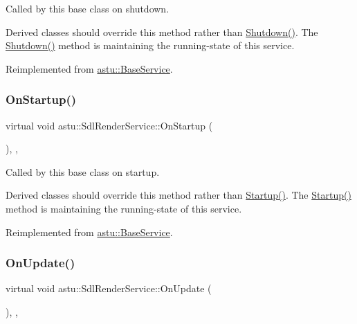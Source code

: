 Called by this base class on shutdown.

Derived classes should override this method rather than {\ttfamily \hyperlink{classastu_1_1UpdatableBaseService_a7ad7e0201007878b6014361dd5ba82f9}{Shutdown()}}. The {\ttfamily \hyperlink{classastu_1_1UpdatableBaseService_a7ad7e0201007878b6014361dd5ba82f9}{Shutdown()}} method is maintaining the running-\/state of this service. 

Reimplemented from \hyperlink{classastu_1_1BaseService_aeb5003f7c5efe5412725ac4c66942d03}{astu\+::\+Base\+Service}.

\mbox{\label{classastu_1_1SdlRenderService_a38abd541e8075e5e4eb702ca99c9b0a5}} 
\subsubsection{\texorpdfstring{On\+Startup()}{OnStartup()}}
{\footnotesize\ttfamily virtual void astu\+::\+Sdl\+Render\+Service\+::\+On\+Startup (\begin{DoxyParamCaption}{ }\end{DoxyParamCaption})\hspace{0.3cm}{\ttfamily [override]}, {\ttfamily [protected]}, {\ttfamily [virtual]}}

Called by this base class on startup.

Derived classes should override this method rather than {\ttfamily \hyperlink{classastu_1_1UpdatableBaseService_a47e3725f717cee3cd8983f485b2a0243}{Startup()}}. The {\ttfamily \hyperlink{classastu_1_1UpdatableBaseService_a47e3725f717cee3cd8983f485b2a0243}{Startup()}} method is maintaining the running-\/state of this service. 

Reimplemented from \hyperlink{classastu_1_1BaseService_ac8710cd2d6dcc990db65e7c8ccfbc5ff}{astu\+::\+Base\+Service}.

\mbox{\label{classastu_1_1SdlRenderService_af109517e98ab8bce1e625122a441fb75}} 
\subsubsection{\texorpdfstring{On\+Update()}{OnUpdate()}}
{\footnotesize\ttfamily virtual void astu\+::\+Sdl\+Render\+Service\+::\+On\+Update (\begin{DoxyParamCaption}{ }\end{DoxyParamCaption})\hspace{0.3cm}{\ttfamily [override]}, {\ttfamily [protected]}, {\ttfamily [virtual]}}

